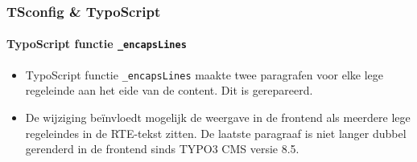 \begin{frame}[fragile]
	\frametitle{TSconfig \& TypoScript}
	\framesubtitle{TypoScript functie \texttt{\_encapsLines}}

	\begin{itemize}
		\item TypoScript functie \texttt{\_encapsLines} maakte twee paragrafen voor elke lege regeleinde
		 	aan het eide van de content. Dit is gerepareerd.

		\item De wijziging beïnvloedt mogelijk de weergave in de frontend als meerdere lege regeleindes
			in de RTE-tekst zitten. De laatste paragraaf is niet langer dubbel gerenderd in de frontend
			sinds TYPO3 CMS versie 8.5.

	\end{itemize}

\end{frame}

